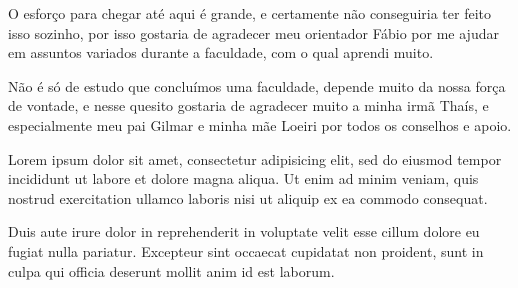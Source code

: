 \begin{agradecimentos}


O esforço para chegar até aqui é grande, e certamente não conseguiria ter feito isso sozinho, por isso gostaria de agradecer meu orientador Fábio por me ajudar em assuntos variados durante a faculdade, com o qual aprendi muito. 

Não é só de estudo que concluímos uma faculdade, depende muito da nossa força de vontade, e nesse quesito gostaria de agradecer muito a minha irmã Thaís, e especialmente meu pai Gilmar e minha mãe Loeiri por todos os conselhos e apoio. 

Lorem ipsum dolor sit amet, consectetur adipisicing elit, sed do eiusmod
tempor incididunt ut labore et dolore magna aliqua. Ut enim ad minim veniam,
quis nostrud exercitation ullamco laboris nisi ut aliquip ex ea commodo
consequat. 

Duis aute irure dolor in reprehenderit in voluptate velit esse
cillum dolore eu fugiat nulla pariatur. Excepteur sint occaecat cupidatat non
proident, sunt in culpa qui officia deserunt mollit anim id est laborum.

\end{agradecimentos}